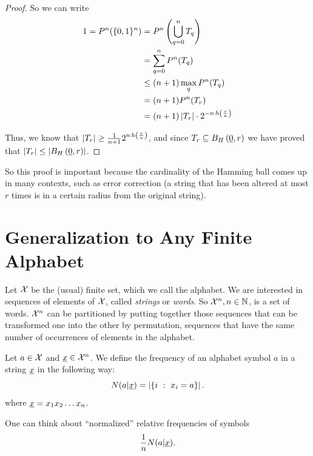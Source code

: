 \begin{proof}
	So we can write
	\begin{align*}
		1
		=
		P^n(\{0,1\}^n)
		& =
		P^n\left(\bigcup_{q=0}^nT_q\right)
		\\
		& =
		\sum_{q=0}^n P^n(T_q)
		\\
		& \le
		(n+1) \max_q P^n(T_q)
		\\
		& =
		(n+1) P^n(T_r)
		\\
		& =
		(n + 1) \left|{T_r}\right| \cdot 2^{-n \, h \left(\frac{r}{n}\right)}
	\end{align*}

	Thus, we know that $\left|{T_r}\right| \ge \frac{1}{n+1} 2^{n \, h\left({\frac{r}{n}}\right)}$, and since $T_r \subseteq B_H\left(\underline{0}, r\right)$ we have proved that $\left|{T_r}\right| \le \left|{B_H\left(\underline{0}, r\right)}\right|$.
\end{proof}

So this proof is important because the cardinality of the Hamming ball comes up in many contexts, such as error correction (a string that has been altered at most $r$ times is in a certain radius from the original string).

\section{Generalization to Any Finite Alphabet}

Let $\mathcal{X}$ be the (usual) finite set, which we call the alphabet.
We are interested in sequences of elements of $\mathcal{X}$, called \emph{strings} or \emph{words}.
So $\mathcal{X}^n, n \in \mathbb{N}$, is a set of words.
$\mathcal{X}^n$ can be partitioned by putting together those sequences that can be transformed one into the other by permutation, \ie sequences that have the same number of occurrences of elements in the alphabet.

\begin{definition}
	Let $a \in \mathcal{X}$ and $\underline{x} \in \mathcal{X}^n$.
	We define the frequency of an alphabet symbol $a$ in a string $\underline{x}$ in the following way:  
	\begin{equation*}
	N(a | \underline{x}) = \left|{\{i\ :\ x_i = a\}}\right|.
	\end{equation*}
	where $\underline{x} = x_1 x_2 \ldots x_n$.
\end{definition}

One can think about ``normalized'' relative frequencies of symbols
\begin{equation*}
	\frac{1}{n} N(a|\underline{x}).
\end{equation*}

